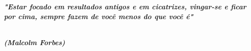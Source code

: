 %
%

\begin{epigrafe}
		
	\textit{\textbf{"Estar focado em resultados antigos e em cicatrizes, vingar-se e ficar por cima, sempre fazem de você menos do que você é"}}{\\}{\\}
	
	\begin{autorepigrafe}
		\textit{\textbf{(Malcolm Forbes)}}
	\end{autorepigrafe}
		
\end{epigrafe}